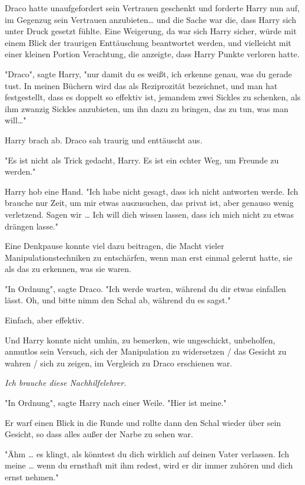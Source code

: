 {Draco hatte unaufgefordert sein Vertrauen geschenkt und forderte Harry nun auf, im Gegenzug sein Vertrauen anzubieten… und die Sache war die, dass Harry sich unter Druck gesetzt fühlte. Eine Weigerung, da war sich Harry sicher, würde mit einem Blick der traurigen Enttäuschung beantwortet werden, und vielleicht mit einer kleinen Portion Verachtung, die anzeigte, dass Harry Punkte verloren hatte.

"Draco", sagte Harry, "nur damit du es weißt, ich erkenne genau, was du gerade tust. In meinen Büchern wird das als Reziprozität bezeichnet, und man hat festgestellt, dass es doppelt so effektiv ist, jemandem zwei Sickles zu schenken, als ihm zwanzig Sickles anzubieten, um ihn dazu zu bringen, das zu tun, was man will…"

Harry brach ab. Draco sah traurig und enttäuscht aus.

"Es ist nicht als Trick gedacht, Harry. Es ist ein echter Weg, um Freunde zu werden."

Harry hob eine Hand. "Ich habe nicht gesagt, dass ich nicht antworten werde. Ich brauche nur Zeit, um mir etwas auszusuchen, das privat ist, aber genauso wenig verletzend. Sagen wir … Ich will dich wissen lassen, dass ich mich nicht zu etwas drängen lasse."

Eine Denkpause konnte viel dazu beitragen, die Macht vieler Manipulationstechniken zu entschärfen, wenn man erst einmal gelernt hatte, sie als das zu erkennen, was sie waren.

"In Ordnung", sagte Draco. "Ich werde warten, während du dir etwas einfallen lässt. Oh, und bitte nimm den Schal ab, während du es sagst."

Einfach, aber effektiv.

Und Harry konnte nicht umhin, zu bemerken, wie ungeschickt, unbeholfen, anmutlos sein Versuch, sich der Manipulation zu widersetzen / das Gesicht zu wahren / sich zu zeigen, im Vergleich zu Draco erschienen war.

\emph{Ich brauche diese Nachhilfelehrer.}

"In Ordnung", sagte Harry nach einer Weile. "Hier ist meine."

Er warf einen Blick in die Runde und rollte dann den Schal wieder über sein Gesicht, so dass alles außer der Narbe zu sehen war.

"Ähm … es klingt, als könntest du dich wirklich auf deinen Vater verlassen. Ich meine … wenn du ernsthaft mit ihm redest, wird er dir immer zuhören und dich ernst nehmen."

}
